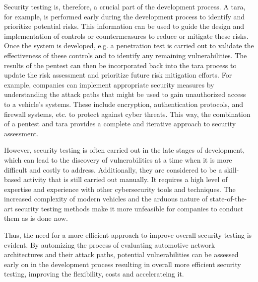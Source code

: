Security testing is, therefore, a crucial part of the development process.
A \gls{tara}, for example, is performed early during the development process to identify and prioritize potential risks.
This information can be used to guide the design and implementation of controls or countermeasures to reduce or mitigate these risks.
Once the system is developed, e.g. a penetration test is carried out to validate the effectiveness of these controls and to identify any remaining vulnerabilities. 
The results of the pentest can then be incorporated back into the \gls{tara} process to update the risk assessment and prioritize future risk mitigation efforts. 
For example, companies can implement appropriate security measures by understanding the attack paths that might be used to gain unauthorized access to a vehicle's systems. 
These include encryption, authentication protocols, and firewall systems, etc. to protect against cyber threats.
This way, the combination of a pentest and \gls{tara} provides a complete and iterative approach to security assessment.\par
However, security testing is often carried out in the late stages of development, which can lead to the discovery of vulnerabilities at a time when it is more difficult and costly to address.
Additionally, they are considered to be a skill-based activity that is still carried out manually.
It requires a high level of expertise and experience with other cybersecurity tools and techniques. 
The increased complexity of modern vehicles and the arduous nature of state-of-the-art security testing methods make it more unfeasible for companies to conduct them as is done now.\par
Thus, the need for a more efficient approach to improve overall security testing is evident. 
By automizing the process of evaluating automotive network architectures and their attack paths, 
potential vulnerabilities can be assessed early on in the development process resulting in overall more efficient security testing, improving the flexibility, costs and accelerateing it.
\\

